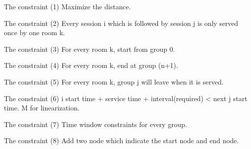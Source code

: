 The constraint (1) Maximize the distance.

The constraint (2) Every session i which is followed by session j is only served once by one room k.

The constraint (3) For every room k, start from group 0.

The constraint (4) For every room k, end at group (n+1).

The constraint (5) For every room k, group j will leave when it is served.

The constraint (6) i start time + service time + interval(required) < next j start time. M for linearization.

The constraint (7) Time window constraints for every group. 

The constraint (8) Add two node which indicate the start node and end node.


